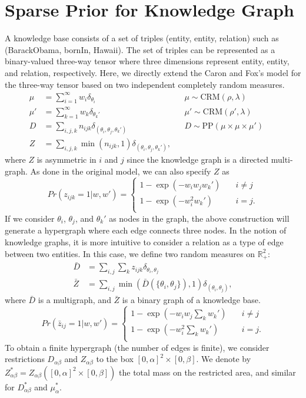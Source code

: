 \documentclass{article}
\begin{document}
\section{Sparse Prior for Knowledge Graph}
A knowledge base consists of a set of triples (entity, entity, relation) such as (BarackObama, bornIn, Hawaii). The set of triples can be represented as a binary-valued three-way tensor where three dimensions represent entity, entity, and relation, respectively. Here, we directly extend the Caron and Fox's model for the three-way tensor based on two independent completely random measures.
\begin{align}
\mu &= \sum_{i=1}^{\infty} w_i \delta_{\theta_i} & &\mu \sim \text{CRM}(\rho, \lambda)\\
\mu' &= \sum_{k=1}^{\infty} w_k \delta_{\theta_k'} & &\mu' \sim \text{CRM}(\rho', \lambda)\\
D &= \sum_{i,j,k} n_{ijk} \delta_{(\theta_i, \theta_j, \theta_k')}& &D \sim \text{PP}(\mu \times \mu \times \mu') && \\
Z &=\sum_{i,j,k} \min(n_{ijk}, 1)\delta_{(\theta_i, \theta_j, \theta_k')}, &&
\end{align}
where $Z$ is asymmetric in $i$ and $j$ since the knowledge graph is a directed multi-graph. As done in the original model, we can also specify $Z$ as
\[ Pr(z_{ijk}=1|w, w') = 
  \begin{cases}
    1 - \exp(-w_iw_jw_k')       & \quad i \neq j\\
    1 - \exp(-w_i^2w_k') & \quad i = j.\\
  \end{cases}
\]
If we consider $\theta_i$, $\theta_j$, and $\theta_k'$ as nodes in the graph, the above construction will generate a hypergraph where each edge connects three nodes. In the notion of knowledge graphs, it is more intuitive to consider a relation as a type of edge between two entities. In this case, we define two random measures on $\mathbb{R}_+^2$:
\begin{align}
\bar{D} &= \sum_{i,j}\sum_{k}z_{ijk}\delta_{\theta_i,\theta_j}\\
\bar{Z} &= \sum_{i,j}\min(\bar{D}(\{\theta_i, \theta_j\}), 1) \delta_{(\theta_i,\theta_j)},
\end{align}
where $\bar{D}$ is a multigraph, and $\bar{Z}$ is a binary graph of a knowledge base.
\[ Pr(\bar{z}_{ij}=1|w, w') = 
  \begin{cases}
    1 - \exp(-w_iw_j\sum_{k}w_k')       & \quad i \neq j\\
    1 - \exp(-w_i^2\sum_{k}w_k') & \quad i = j.\\
  \end{cases}
\]
To obtain a finite hypergraph (the number of edges is finite), we consider restrictions ${D}_{\alpha\beta}$ and ${Z}_{\alpha\beta}$ to the box $[0,\alpha]^2\times[0,\beta]$. We denote by $Z_{\alpha\beta}^* = Z_{\alpha\beta}([0,\alpha]^2\times[0,\beta])$ the total mass on the restricted area, and similar for $D_{\alpha\beta}^*$ and $\mu_{\alpha}^*$.
\end{document}
